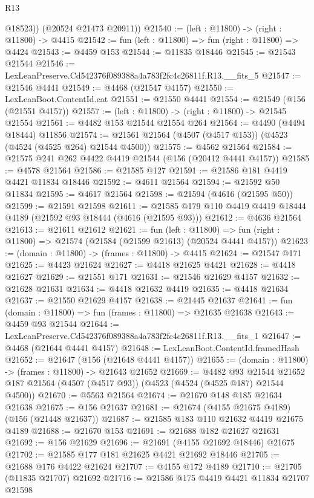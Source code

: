 \begin{lexlean}{R13}
\begin{coremodule}
          @18523))
      (@20524 @21473 @20911))
@21540 := (left : @11800) -> (right : @11800) -> @4415
@21542 := fun (left : @11800) => fun (right : @11800) => @4424
@21543 := @4459 @153
@21544 := @11835 @18446
@21545 := @21543 @21544
@21546 := LexLeanPreserve.Cd542376f089388a4a783f2fc4c26811f.R13.__fits_5
@21547 := @21546 @4441
@21549 := @4468 (@21547 @4157)
@21550 := LexLeanBoot.ContentId.cat
@21551 := @21550 @4441
@21554 := @21549 (@156 (@21551 @4157))
@21557 := (left : @11800) -> (right : @11800) -> @21545 @21554
@21561 := @4482 @153 @21544 @21554 @264
@21564 := @4490 (@4494 @18444) @11856
@21574 := @21561 @21564 (@4507 (@4517 @153)) (@4523 (@4524 (@4525 @264) @21544 @4500))
@21575 := @4562 @21564
@21584 := @21575 @241 @262 @4422 @4419 @21544 (@156 (@20412 @4441 @4157))
@21585 := @4578 @21564
@21586 := @21585 @127
@21591 := @21586 @181 @4419 @4421 @11834 @18446
@21592 := @4611 @21564
@21594 := @21592 @50 @11834
@21595 := @4617 @21564
@21598 := @21594 (@4616 (@21595 @50))
@21599 := @21591 @21598
@21611 := @21585 @179 @110 @4419 @4419 @18444 @4189 (@21592 @93 @18444 (@4616 (@21595 @93)))
@21612 := @4636 @21564
@21613 := @21611 @21612
@21621 := fun (left : @11800) =>
  fun (right : @11800) => @21574 (@21584 (@21599 @21613) (@20524 @4441 @4157))
@21623 := (domain : @11800) -> (frames : @11800) -> @4415
@21624 := @21547 @171
@21625 := @4423 @21624
@21627 := @4418 @21625 @4421
@21628 := @4418 @21627
@21629 := @21551 @171
@21631 := @21546 @21629 @4157
@21632 := @21628 @21631
@21634 := @4418 @21632 @4419
@21635 := @4418 @21634
@21637 := @21550 @21629 @4157
@21638 := @21445 @21637
@21641 := fun (domain : @11800) => fun (frames : @11800) => @21635 @21638
@21643 := @4459 @93 @21544
@21644 := LexLeanPreserve.Cd542376f089388a4a783f2fc4c26811f.R13.__fits_1
@21647 := @4468 (@21644 @4441 @4157)
@21648 := LexLeanBoot.ContentId.framedHash
@21652 := @21647 (@156 (@21648 @4441 @4157))
@21655 := (domain : @11800) -> (frames : @11800) -> @21643 @21652
@21669 := @4482
    @93
    @21544
    @21652
    @187
    @21564
    (@4507 (@4517 @93))
    (@4523 (@4524 (@4525 @187) @21544 @4500))
@21670 := @5563 @21564
@21674 := @21670 @148 @185 @21634 @21638
@21675 := @156 @21637
@21681 := @21674 (@4155 @21675 @4189) (@156 (@21448 @21637))
@21687 := @21585 @183 @110 @21632 @4419 @21675 @4189
@21688 := @21670 @153
@21691 := @21688 @182 @21627 @21631
@21692 := @156 @21629
@21696 := @21691 (@4155 @21692 @18446) @21675
@21702 := @21585 @177 @181 @21625 @4421 @21692 @18446
@21705 := @21688 @176 @4422 @21624
@21707 := @4155 @172 @4189
@21710 := @21705 (@11835 @21707) @21692
@21716 := @21586 @175 @4419 @4421 @11834 @21707 @21598

\end{coremodule}
\end{lexlean}
